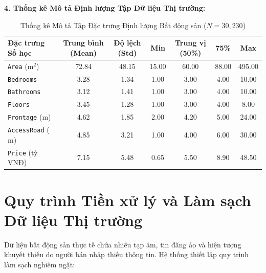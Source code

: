 \documentclass[12pt,a4paper]{report}
\begin{document}
\textbf{4. Thống kê Mô tả Định lượng Tập Dữ liệu Thị trường:}
\begin{table}[H]
\centering
\small
\begin{tabular}{lcccccc}
\toprule
\textbf{Đặc trưng Số học} & \textbf{Trung bình (Mean)} & \textbf{Độ lệch (Std)} & \textbf{Min} & \textbf{Trung vị (50\%)} & \textbf{75\%} & \textbf{Max} \\
\midrule
\texttt{Area} ($\text{m}^2$) & 72.84 & 48.15 & 15.00 & 60.00 & 88.00 & 495.00 \\
\texttt{Bedrooms} & 3.28 & 1.34 & 1.00 & 3.00 & 4.00 & 10.00 \\
\texttt{Bathrooms} & 3.12 & 1.41 & 1.00 & 3.00 & 4.00 & 10.00 \\
\texttt{Floors} & 3.45 & 1.28 & 1.00 & 3.00 & 4.00 & 8.00 \\
\texttt{Frontage} ($\text{m}$) & 4.62 & 1.85 & 2.00 & 4.20 & 5.00 & 24.00 \\
\texttt{AccessRoad} ($\text{m}$) & 4.85 & 3.21 & 1.00 & 4.00 & 6.00 & 30.00 \\
\texttt{Price} (tỷ VNĐ) & 7.15 & 5.48 & 0.65 & 5.50 & 8.90 & 48.50 \\
\bottomrule
\end{tabular}
\caption{Thống kê Mô tả Tập Đặc trưng Định lượng Bất động sản ($N = 30,230$)}
\label{tab:realestate_descriptive_stats}
\end{table}

\section{Quy trình Tiền xử lý và Làm sạch Dữ liệu Thị trường}

Dữ liệu bất động sản thực tế chứa nhiều tạp âm, tin đăng ảo và hiện tượng khuyết thiếu do người bán nhập thiếu thông tin. Hệ thống thiết lập quy trình làm sạch nghiêm ngặt:
\end{document}
